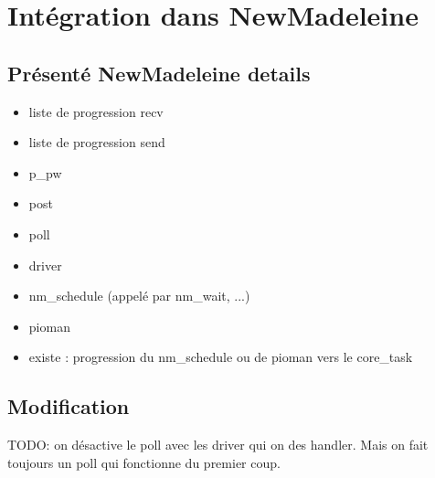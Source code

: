 \section{Intégration dans NewMadeleine}


\subsection{Présenté NewMadeleine details}

\begin{itemize}
  \item liste de progression recv
  \item liste de progression send
  \item p_pw
  \item post
  \item poll
  \item driver
  \item nm_schedule (appelé par nm_wait, ...)
  \item pioman
  \item existe : progression du nm_schedule ou de pioman vers le core_task
\end{itemize}

\subsection{Modification}

TODO: on désactive le poll avec les driver qui on des handler. Mais on fait toujours un poll qui fonctionne du premier coup.

